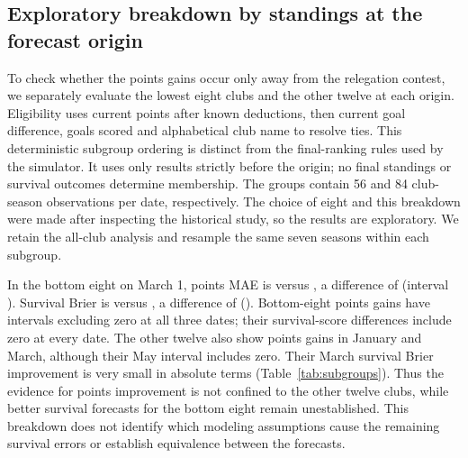 \documentclass[11pt]{article}
\begin{document}
\subsection{Exploratory breakdown by standings at the forecast origin}
To check whether the points gains occur only away from the relegation contest,
we separately evaluate the lowest eight clubs and the other twelve at each
origin. Eligibility uses current points after known deductions, then current
goal difference, goals scored and alphabetical club name to resolve ties.
This deterministic subgroup ordering is distinct from the final-ranking rules
used by the simulator. It uses only results strictly before the origin; no
final standings or survival outcomes determine membership.
The groups contain 56 and 84 club-season observations per date, respectively.
The choice of eight and this breakdown were made after inspecting the
historical study, so the results are exploratory. We retain the all-club
analysis and resample the same seven seasons within each subgroup.

\begin{table}[ht]
\centering
\caption{Exploratory origin-defined subgroup comparisons. Differences are
Dixon--Coles minus league-average Poisson; negative values favor Dixon--Coles.
Brackets are paired 95\% season-bootstrap intervals. $n$ counts club-season
observations at each date, not independent seasons.}
\label{tab:subgroups}

\end{table}

In the bottom eight on March 1, points MAE is \BottomMarchMAE{} versus
\BottomMarchBaselineMAE{}, a difference of \BottomMarchMAEDifference{}
(interval \BottomMarchMAECI{}). Survival Brier is \BottomMarchBrier{}
versus \BottomMarchBaselineBrier{}, a difference of
\BottomMarchBrierDifference{} (\BottomMarchBrierCI{}).
Bottom-eight points gains have intervals excluding zero at all three dates;
their survival-score differences include zero at every date.
The other twelve also show points gains in January and March, although their
May interval includes zero. Their March survival Brier improvement is very
small in absolute terms (Table~\ref{tab:subgroups}).
Thus the evidence for points improvement is not confined to the other twelve
clubs, while better survival forecasts for the bottom eight remain unestablished.
This breakdown does not identify which modeling assumptions cause the remaining
survival errors or establish equivalence between the forecasts.
\end{document}
